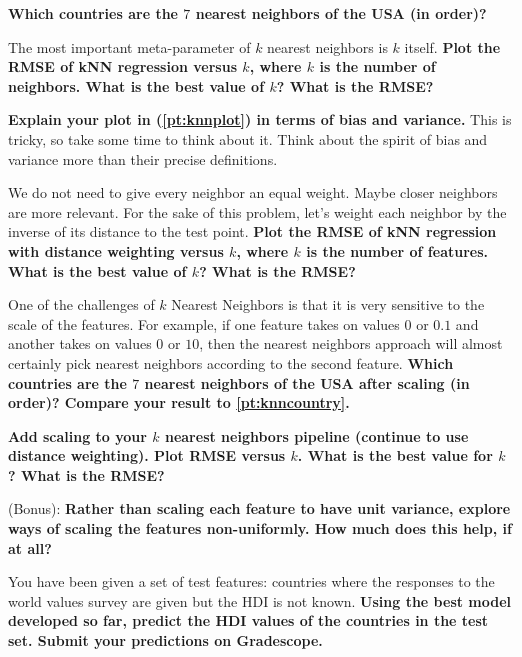 \documentclass[preview]{standalone}
\begin{document}
\begin{Parts}
\Part \label{pt:knncountry} \textbf{Which countries are the $7$ nearest neighbors of the USA (in order)?}




\Part \label{pt:knnplot} The most important meta-parameter of $k$ nearest neighbors is $k$ itself. \textbf{Plot the RMSE of kNN regression versus $k$, where $k$ is the number of neighbors. What is the best value of $k$? What is the RMSE?}




\Part \textbf{Explain your plot in (\ref{pt:knnplot}) in terms of bias and variance.} This is tricky, so take some time to think about it. Think about the spirit of bias and variance more than their precise definitions.




\Part We do not need to give every neighbor an equal weight. Maybe closer neighbors are more relevant. For the sake of this problem, let's weight each neighbor by the inverse of its distance to the test point. \textbf{Plot the RMSE of kNN regression with distance weighting versus $k$, where $k$ is the number of features. What is the best value of $k$? What is the RMSE?}




\Part One of the challenges of $k$ Nearest Neighbors is that it is very sensitive to the scale of the features. For example, if one feature takes on values $0$ or $0.1$ and another takes on values $0$ or $10$, then the nearest neighbors approach will almost certainly pick nearest neighbors according to the second feature. \textbf{Which countries are the $7$ nearest neighbors of the USA after scaling (in order)? Compare your result to \ref{pt:knncountry}.}




\Part \textbf{Add scaling to your $k$ nearest neighbors pipeline (continue to use distance weighting). Plot RMSE versus $k$. What is the best value for $k$? What is the RMSE?}




\Part (Bonus): \textbf{Rather than scaling each feature to have unit variance, explore ways of scaling the features non-uniformly. How much does this help, if at all?}




\Part You have been given a set of test features: countries where the responses to the world values survey are given but the HDI is not known. \textbf{Using the best model developed so far, predict the HDI values of the countries in the test set. Submit your predictions on Gradescope.}





\end{Parts}
\end{document}
